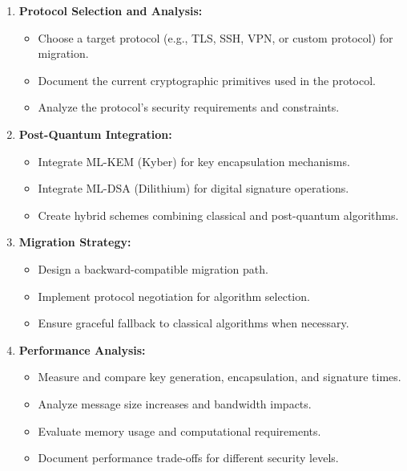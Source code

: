 \documentclass[10pt,a4paper,american]{exam}
\begin{document}
\begin{enumerate}
	\item \textbf{Protocol Selection and Analysis:}
	      \begin{itemize}
		      \item Choose a target protocol (e.g., TLS, SSH, VPN, or custom protocol) for migration.
		      \item Document the current cryptographic primitives used in the protocol.
		      \item Analyze the protocol's security requirements and constraints.
	      \end{itemize}

	\item \textbf{Post-Quantum Integration:}
	      \begin{itemize}
		      \item Integrate ML-KEM (Kyber) for key encapsulation mechanisms.
		      \item Integrate ML-DSA (Dilithium) for digital signature operations.
		      \item Create hybrid schemes combining classical and post-quantum algorithms.
	      \end{itemize}

	\item \textbf{Migration Strategy:}
	      \begin{itemize}
		      \item Design a backward-compatible migration path.
		      \item Implement protocol negotiation for algorithm selection.
		      \item Ensure graceful fallback to classical algorithms when necessary.
	      \end{itemize}

	\item \textbf{Performance Analysis:}
	      \begin{itemize}
		      \item Measure and compare key generation, encapsulation, and signature times.
		      \item Analyze message size increases and bandwidth impacts.
		      \item Evaluate memory usage and computational requirements.
		      \item Document performance trade-offs for different security levels.
	      \end{itemize}
\end{enumerate}
\end{document}
